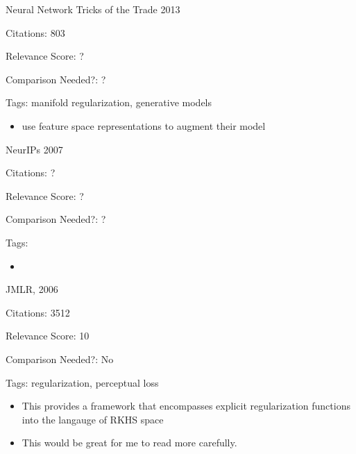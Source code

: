 \documentclass[11pt]{article}
\begin{document}
 

\vspace{2cm}

\noindent Neural Network Tricks of the Trade 2013

\noindent Citations: 803

\noindent Relevance Score: ?

\noindent Comparison Needed?: ?

\noindent Tags: manifold regularization, generative models

\begin{itemize}
\item use feature space representations to augment their model
\end{itemize}

\vspace{2cm}

\noindent NeurIPs 2007

\noindent Citations: ?

\noindent Relevance Score: ?

\noindent Comparison Needed?: ?

\noindent Tags:


\begin{itemize}
\item 
\end{itemize}

\vspace{2cm} 

\noindent JMLR, 2006

\noindent Citations: 3512

\noindent Relevance Score: 10

\noindent Comparison Needed?: No

\noindent Tags: regularization, perceptual loss

\begin{itemize}
\item This provides a framework that encompasses explicit regularization functions into the langauge of RKHS space
\item This would be great for me to read more carefully.
\end{itemize}

\vspace{2cm}
\end{document}
